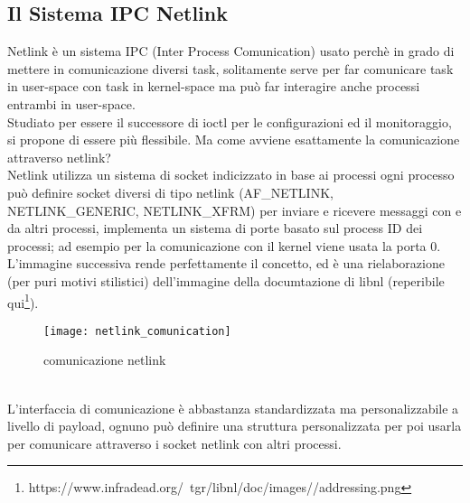 \subsection{Il Sistema IPC Netlink}
Netlink \`e un sistema IPC (Inter Process Comunication) usato perch\`e in grado di mettere in comunicazione diversi task, solitamente serve per far comunicare task in user-space con task in kernel-space ma pu\`o far interagire anche processi entrambi in user-space.\\
Studiato per essere il successore di ioctl per le configurazioni ed il monitoraggio, si propone di essere pi\`u flessibile.
Ma come avviene esattamente la comunicazione attraverso netlink?\\
Netlink utilizza un sistema di socket indicizzato in base ai processi ogni processo pu\`o definire socket diversi di tipo netlink (AF\_NETLINK, NETLINK\_GENERIC, NETLINK\_XFRM) per inviare e ricevere messaggi con e da altri processi, implementa un sistema di porte basato sul process ID dei processi; ad esempio per la comunicazione con il kernel viene usata la porta 0.\\
L'immagine successiva rende perfettamente il concetto, ed \`e una rielaborazione (per puri motivi stilistici) dell'immagine della documtazione di libnl (reperibile qui\footnote{https://www.infradead.org/~tgr/libnl/doc/images//addressing.png}).
\begin{figure}[h]                       %
\begin{center}                          %
\texttt{[image: netlink\_comunication]}%
%
\caption[scambio di messaggi attraverso socket netlink]{comunicazione netlink}
\end{center}
\end{figure}\\
L'interfaccia di comunicazione \`e abbastanza standardizzata ma personalizzabile a livello di payload, ognuno pu\`o definire una struttura personalizzata per poi usarla per comunicare attraverso i socket netlink con altri processi.
